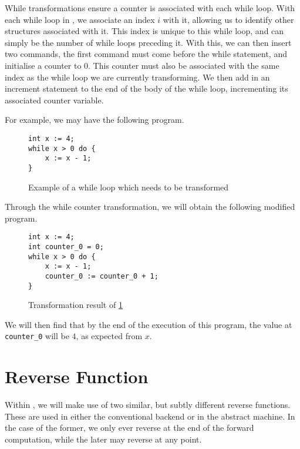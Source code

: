 While transformations ensure a counter is associated with each while loop. With each while loop in \rimplang, we associate an index $i$ with it, allowing us to identify other structures associated with it. This index is unique to this while loop, and can simply be the number of while loops preceding it. With this, we can then insert two commands, the first command must come before the while statement, and initialise a counter to $0$. This counter must also be associated with the same index as the while loop we are currently transforming. We then add in an increment statement to the end of the body of the while loop, incrementing its associated counter variable.

For example, we may have the following program.

\begin{figure}[hbt!]
    \centering
    \begin{lstlisting}[label={lst:whileloop}, basicstyle=\small]
int x := 4;
while x > 0 do {
    x := x - 1;
}
    \end{lstlisting}
    \caption{Example of a while loop which needs to be transformed}
    \label{fig:whileloop}
\end{figure}

Through the while counter transformation, we will obtain the following modified program.

\begin{figure}[hbt!]
    \centering
    \begin{lstlisting}[label={lst:whileloopmodified}, basicstyle=\small]
int x := 4;
int counter_0 = 0;
while x > 0 do {
    x := x - 1;
    counter_0 := counter_0 + 1;
}
    \end{lstlisting}
    \caption{Transformation result of \ref{fig:whileloop}}
    \label{fig:whileloopmodified}
\end{figure}

We will then find that by the end of the execution of this program, the value at \lstinline{counter_0} will be $4$, as expected from $x$.

\section{Reverse Function}

Within \rimp, we will make use of two similar, but subtly different reverse functions. These are used in either the conventional backend or in the abstract machine. In the case of the former, we only ever reverse at the end of the forward computation, while the later may reverse at any point.

